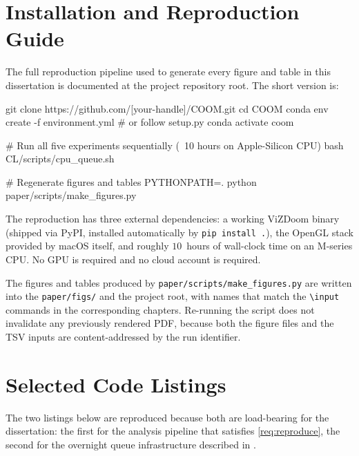 \appendix

\chapter{Installation and Reproduction Guide}
\label{app:install}

The full reproduction pipeline used to generate every figure
and table in this dissertation is documented at the project
repository root. The short version is:

\begin{code}[language=bash, caption={End-to-end reproduction
    commands.}, label={lst:reproduce}]
git clone https://github.com/[your-handle]/COOM.git
cd COOM
conda env create -f environment.yml   # or follow setup.py
conda activate coom

# Run all five experiments sequentially (~10 hours on Apple-Silicon CPU)
bash CL/scripts/cpu_queue.sh

# Regenerate figures and tables
PYTHONPATH=. python paper/scripts/make_figures.py
\end{code}

The reproduction has three external dependencies: a working
ViZDoom binary (shipped via PyPI, installed automatically by
\texttt{pip install .}), the OpenGL stack provided by macOS
itself, and roughly $10$~hours of wall-clock time on an
M-series CPU. No GPU is required and no cloud account is
required.

The figures and tables produced by
\texttt{paper/scripts/make\_figures.py} are written into the
\texttt{paper/figs/} and the project root, with names that match
the \texttt{\textbackslash input} commands in the corresponding
chapters. Re-running the script does not invalidate any
previously rendered PDF, because both the figure files and the
TSV inputs are content-addressed by the run identifier.

\chapter{Selected Code Listings}
\label{app:code}

The two listings below are reproduced because both are
load-bearing for the dissertation: the first for the analysis
pipeline that satisfies \ref{req:reproduce}, the second for the
overnight queue infrastructure described in .

